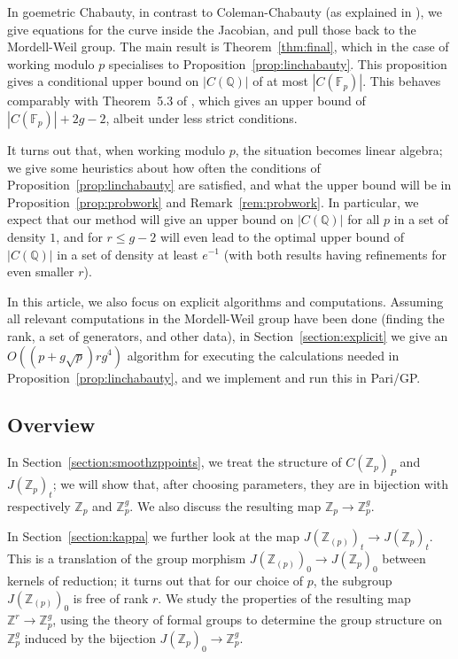 \documentclass[12pt]{article}
\newcommand{\Z}{\mathbb{Z}}
\newcommand{\Q}{\mathbb{Q}}
\newcommand{\F}{\mathbb{F}}
\theoremstyle{plain}
\theoremstyle{definition}
\theoremstyle{remark}
\begin{document}
In goemetric Chabauty, in contrast to Coleman-Chabauty (as explained in \cite{poonen12}), we give equations for the curve inside the Jacobian, and pull those back to the Mordell-Weil group. The main result is Theorem~\ref{thm:final}, which in the case of working modulo $p$ specialises to Proposition~\ref{prop:linchabauty}. This proposition gives a conditional upper bound on $|C(\Q)|$ of at most $|C(\F_p)|$. This behaves comparably with Theorem~5.3 of \cite{poonen12}, which gives an upper bound of $|C(\F_p)| + 2g-2$, albeit under less strict conditions.

It turns out that, when working modulo $p$, the situation becomes linear algebra; we give some heuristics about how often the conditions of Proposition~\ref{prop:linchabauty} are satisfied, and what the upper bound will be in Proposition~\ref{prop:probwork} and Remark~\ref{rem:probwork}. In particular, we expect that our method will give an upper bound on $|C(\Q)|$ for all $p$ in a set of density $1$, and for $r \leq g-2$ will even lead to the optimal upper bound of $|C(\Q)|$ in a set of density at least $e^{-1}$ (with both results having refinements for even smaller $r$).

In this article, we also focus on explicit algorithms and computations. Assuming all relevant computations in the Mordell-Weil group have been done (finding the rank, a set of generators, and other data), in Section~\ref{section:explicit} we give an $O((p+g\sqrt{p})rg^{4})$ algorithm for executing the calculations needed in Proposition~\ref{prop:linchabauty}, and we implement and run this in Pari/GP.

\subsection{Overview}
In Section~\ref{section:smoothzppoints}, we treat the structure of $C(\Z_p)_P$ and $J(\Z_p)_t$; we will show that, after choosing parameters, they are in bijection with respectively $\Z_p$ and $\Z_p^g$. We also discuss the resulting map $\Z_p \to \Z_p^g$.

In Section~\ref{section:kappa} we further look at the map $J(\Z_{(p)})_t \to J(\Z_p)_t$. This is a translation of the group morphism $J(\Z_{(p)})_0 \to J(\Z_p)_0$ between kernels of reduction; it turns out that for our choice of $p$, the subgroup $J(\Z_{(p)})_0$ is free of rank $r$. We study the properties of the resulting map $\Z^r \to \Z_p^g$, using the theory of formal groups to determine the group structure on $\Z_p^g$ induced by the bijection $J(\Z_p)_0 \to \Z_p^g$.
\end{document}
